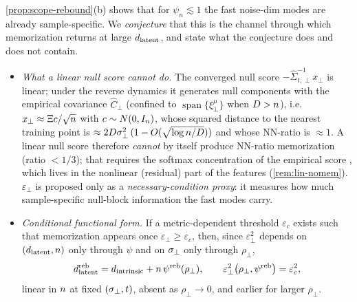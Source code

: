 \begin{remark}\label{rem:scope-rebound-conj}
\cref{prop:scope-rebound}(b) shows that for $\psi_n\lesssim1$ the fast noise-dim modes are already sample-specific. We \emph{conjecture} that this is the channel through which memorization returns at large $d_{\mathrm{latent}}$, and state what the conjecture does and does not contain.
\begin{itemize}
\item[(i)] \emph{What a linear null score cannot do.} The converged null score $-\hat\Sigma_{t,\perp}^{-1}x_\perp$ is linear; under the reverse dynamics it generates null components with the empirical covariance $\hat C_\perp$ (confined to $\operatorname{span}\{\xi^\mu_\perp\}$ when $D>n$), i.e.\ $x_\perp\approx\Xi c/\sqrt{n}$ with $c\sim N(0,I_n)$, whose squared distance to the nearest training point is $\approx2D\sigma_{\perp}^2\,(1-O(\sqrt{\log n/D}))$ and whose NN-ratio is $\approx1$. A linear null score therefore \emph{cannot} by itself produce NN-ratio memorization (ratio $<1/3$); that requires the softmax concentration of the empirical score \citep{biroli2024dynamical,scarvelis2023closedform,gu2023memorization}, which lives in the nonlinear (residual) part of the features (\cref{rem:lin-nomem}). $\varepsilon_\perp$ is proposed only as a \emph{necessary-condition proxy}: it measures how much sample-specific null-block information the fast modes carry.
\item[(ii)] \emph{Conditional functional form.} If a metric-dependent threshold $\varepsilon_c$ exists such that memorization appears once $\varepsilon_\perp\ge\varepsilon_c$, then, since $\varepsilon_\perp^2$ depends on $(d_{\mathrm{latent}},n)$ only through $\psi$ and on $\sigma_{\perp}$ only through $\rho_\perp$,
\begin{equation}\label{eq:scope-rebound}
d_{\mathrm{latent}}^{\rm reb}=d_{\mathrm{intrinsic}}+n\,\psi^{\rm reb}(\rho_\perp),\qquad \varepsilon_\perp^2\big(\rho_\perp,\psi^{\rm reb}\big)=\varepsilon_c^2 ,
\end{equation}
linear in $n$ at fixed $(\sigma_{\perp},t)$, absent as $\rho_\perp\to0$, and earlier for larger $\rho_\perp$.

\end{itemize}
\end{remark}
